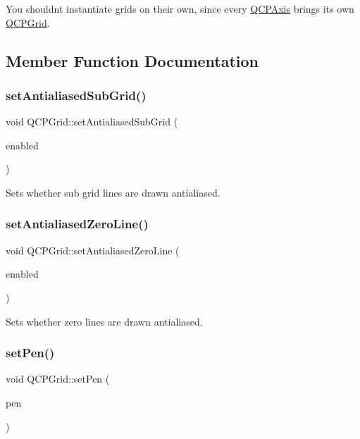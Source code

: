 You shouldn\textquotesingle{}t instantiate grids on their own, since every \mbox{\hyperlink{class_q_c_p_axis}{Q\+C\+P\+Axis}} brings its own \mbox{\hyperlink{class_q_c_p_grid}{Q\+C\+P\+Grid}}. 

\subsection{Member Function Documentation}
\mbox{\label{class_q_c_p_grid_a5692310ba183721a413d60951407d114}} 
\subsubsection{\texorpdfstring{set\+Antialiased\+Sub\+Grid()}{setAntialiasedSubGrid()}}
{\footnotesize\ttfamily void Q\+C\+P\+Grid\+::set\+Antialiased\+Sub\+Grid (\begin{DoxyParamCaption}\item[{bool}]{enabled }\end{DoxyParamCaption})}

Sets whether sub grid lines are drawn antialiased. \mbox{\label{class_q_c_p_grid_a3cc6d54647393ee71afb6da56af07aa4}} 
\subsubsection{\texorpdfstring{set\+Antialiased\+Zero\+Line()}{setAntialiasedZeroLine()}}
{\footnotesize\ttfamily void Q\+C\+P\+Grid\+::set\+Antialiased\+Zero\+Line (\begin{DoxyParamCaption}\item[{bool}]{enabled }\end{DoxyParamCaption})}

Sets whether zero lines are drawn antialiased. \mbox{\label{class_q_c_p_grid_aa05ab9816ffb440908171e45e833b593}} 
\subsubsection{\texorpdfstring{set\+Pen()}{setPen()}}
{\footnotesize\ttfamily void Q\+C\+P\+Grid\+::set\+Pen (\begin{DoxyParamCaption}\item[{const Q\+Pen \&}]{pen }\end{DoxyParamCaption})}

